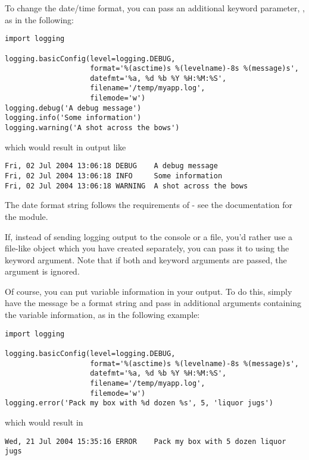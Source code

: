 To change the date/time format, you can pass an additional keyword parameter,
, as in the following:

\begin{verbatim}
import logging

logging.basicConfig(level=logging.DEBUG,
                    format='%(asctime)s %(levelname)-8s %(message)s',
                    datefmt='%a, %d %b %Y %H:%M:%S',
                    filename='/temp/myapp.log',
                    filemode='w')
logging.debug('A debug message')
logging.info('Some information')
logging.warning('A shot across the bows')
\end{verbatim}

which would result in output like

\begin{verbatim}
Fri, 02 Jul 2004 13:06:18 DEBUG    A debug message
Fri, 02 Jul 2004 13:06:18 INFO     Some information
Fri, 02 Jul 2004 13:06:18 WARNING  A shot across the bows
\end{verbatim}

The date format string follows the requirements of  -
see the documentation for the  module.

If, instead of sending logging output to the console or a file, you'd rather
use a file-like object which you have created separately, you can pass it
to  using the  keyword argument. Note
that if both  and  keyword arguments are passed,
the  argument is ignored.

Of course, you can put variable information in your output. To do this,
simply have the message be a format string and pass in additional arguments
containing the variable information, as in the following example:

\begin{verbatim}
import logging

logging.basicConfig(level=logging.DEBUG,
                    format='%(asctime)s %(levelname)-8s %(message)s',
                    datefmt='%a, %d %b %Y %H:%M:%S',
                    filename='/temp/myapp.log',
                    filemode='w')
logging.error('Pack my box with %d dozen %s', 5, 'liquor jugs')
\end{verbatim}

which would result in

\begin{verbatim}
Wed, 21 Jul 2004 15:35:16 ERROR    Pack my box with 5 dozen liquor jugs
\end{verbatim}

